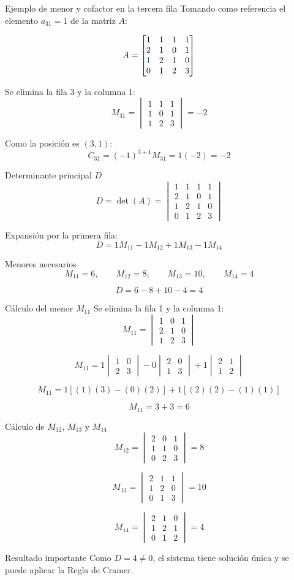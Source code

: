 \documentclass[aspectratio=169]{beamer}
\newcommand{\mat}[1]{\begin{bmatrix}#1\end{bmatrix}}
\newcommand{\detm}[1]{\begin{vmatrix}#1\end{vmatrix}}
\begin{document}
\begin{frame}[shrink=5]{Ejemplo de menor y cofactor en la tercera fila}
Tomando como referencia el elemento $a_{31}=1$ de la matriz $A$:

\[
A=\mat{
1&1&1&1\\
2&1&0&1\\
\color{azulPUCE}{1}&2&1&0\\
0&1&2&3}
\]

Se elimina la fila 3 y la columna 1:
\[
M_{31}=\detm{1&1&1\\1&0&1\\1&2&3}=-2
\]

Como la posición es $(3,1)$:
\[
C_{31}=(-1)^{3+1}M_{31}=1(-2)=\boxed{-2}
\]
\end{frame}

\begin{frame}[shrink=8]{Determinante principal $D$}
\[
D=\det(A)=
\detm{
1&1&1&1\\
2&1&0&1\\
1&2&1&0\\
0&1&2&3}
\]

Expansión por la primera fila:
\[
D=1M_{11}-1M_{12}+1M_{13}-1M_{14}
\]

\begin{block}{Menores necesarios}
\[
M_{11}=6,\qquad M_{12}=8,\qquad M_{13}=10,\qquad M_{14}=4
\]
\end{block}

\[
D=6-8+10-4=\boxed{4}
\]
\end{frame}

\begin{frame}[shrink=6]{Cálculo del menor $M_{11}$}
Se elimina la fila 1 y la columna 1:
\[
M_{11}=\detm{1&0&1\\2&1&0\\1&2&3}
\]

\[
M_{11}=1\detm{1&0\\2&3}-0\detm{2&0\\1&3}+1\detm{2&1\\1&2}
\]

\[
M_{11}=1[(1)(3)-(0)(2)]+1[(2)(2)-(1)(1)]
\]

\[
M_{11}=3+3=\boxed{6}
\]
\end{frame}

\begin{frame}[shrink=8]{Cálculo de $M_{12}$, $M_{13}$ y $M_{14}$}
\[
M_{12}=\detm{2&0&1\\1&1&0\\0&2&3}=\boxed{8}
\]

\[
M_{13}=\detm{2&1&1\\1&2&0\\0&1&3}=\boxed{10}
\]

\[
M_{14}=\detm{2&1&0\\1&2&1\\0&1&2}=\boxed{4}
\]

\begin{alertblock}{Resultado importante}
Como $D=4\neq0$, el sistema tiene solución única y se puede aplicar la Regla de Cramer.
\end{alertblock}
\end{frame}
\end{document}
